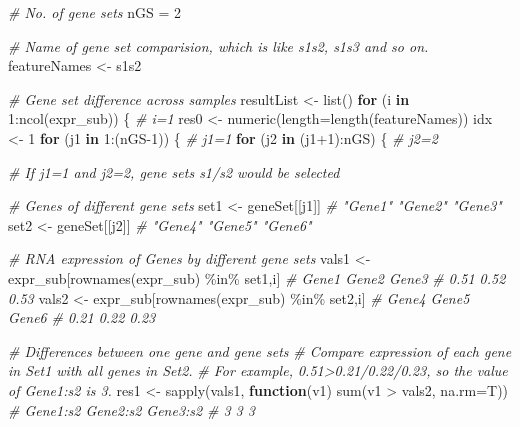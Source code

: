 \documentclass[
  12pt,
]{book}
\newenvironment{Shaded}{\begin{snugshade}}{\end{snugshade}}
\newcommand{\AttributeTok}[1]{\textcolor[rgb]{0.77,0.63,0.00}{#1}}
\newcommand{\CommentTok}[1]{\textcolor[rgb]{0.56,0.35,0.01}{\textit{#1}}}
\newcommand{\ControlFlowTok}[1]{\textcolor[rgb]{0.13,0.29,0.53}{\textbf{#1}}}
\newcommand{\DecValTok}[1]{\textcolor[rgb]{0.00,0.00,0.81}{#1}}
\newcommand{\FunctionTok}[1]{\textcolor[rgb]{0.00,0.00,0.00}{#1}}
\newcommand{\NormalTok}[1]{#1}
\newcommand{\OtherTok}[1]{\textcolor[rgb]{0.56,0.35,0.01}{#1}}
\newcommand{\SpecialCharTok}[1]{\textcolor[rgb]{0.00,0.00,0.00}{#1}}
\newcommand{\StringTok}[1]{\textcolor[rgb]{0.31,0.60,0.02}{#1}}
\begin{document}
\begin{Shaded}
\begin{Highlighting}[]
\CommentTok{\# No. of gene sets}
\NormalTok{nGS }\OtherTok{=} \DecValTok{2}

\CommentTok{\# Name of gene set comparision, which is like s1s2, s1s3 and so on.}
\NormalTok{featureNames }\OtherTok{\textless{}{-}} \StringTok{\textquotesingle{}s1s2\textquotesingle{}}

\CommentTok{\# Gene set difference across samples}
\NormalTok{resultList }\OtherTok{\textless{}{-}} \FunctionTok{list}\NormalTok{()}
\ControlFlowTok{for}\NormalTok{ (i }\ControlFlowTok{in} \DecValTok{1}\SpecialCharTok{:}\FunctionTok{ncol}\NormalTok{(expr\_sub)) \{ }\CommentTok{\# i=1}
\NormalTok{  res0 }\OtherTok{\textless{}{-}} \FunctionTok{numeric}\NormalTok{(}\AttributeTok{length=}\FunctionTok{length}\NormalTok{(featureNames))}
\NormalTok{  idx }\OtherTok{\textless{}{-}} \DecValTok{1}
  \ControlFlowTok{for}\NormalTok{ (j1 }\ControlFlowTok{in} \DecValTok{1}\SpecialCharTok{:}\NormalTok{(nGS}\DecValTok{{-}1}\NormalTok{)) \{ }\CommentTok{\# j1=1}
    \ControlFlowTok{for}\NormalTok{ (j2 }\ControlFlowTok{in}\NormalTok{ (j1}\SpecialCharTok{+}\DecValTok{1}\NormalTok{)}\SpecialCharTok{:}\NormalTok{nGS) \{ }\CommentTok{\# j2=2}
      
      \CommentTok{\# If j1=1 and j2=2, gene sets s1/s2 would be selected}
      
      \CommentTok{\# Genes of different gene sets}
\NormalTok{      set1 }\OtherTok{\textless{}{-}}\NormalTok{ geneSet[[j1]] }\CommentTok{\# "Gene1" "Gene2" "Gene3"}
\NormalTok{      set2 }\OtherTok{\textless{}{-}}\NormalTok{ geneSet[[j2]] }\CommentTok{\# "Gene4" "Gene5" "Gene6"}
      
      \CommentTok{\# RNA expression of Genes by different gene sets}
\NormalTok{      vals1 }\OtherTok{\textless{}{-}}\NormalTok{ expr\_sub[}\FunctionTok{rownames}\NormalTok{(expr\_sub) }\SpecialCharTok{\%in\%}\NormalTok{ set1,i]}
      \CommentTok{\# Gene1 Gene2 Gene3}
      \CommentTok{\# 0.51  0.52  0.53}
\NormalTok{      vals2 }\OtherTok{\textless{}{-}}\NormalTok{ expr\_sub[}\FunctionTok{rownames}\NormalTok{(expr\_sub) }\SpecialCharTok{\%in\%}\NormalTok{ set2,i]}
      \CommentTok{\# Gene4 Gene5 Gene6}
      \CommentTok{\# 0.21  0.22  0.23}

      \CommentTok{\# Differences between one gene and gene sets}
      \CommentTok{\# Compare expression of each gene in Set1 with all genes in Set2. }
      \CommentTok{\# For example, 0.51\textgreater{}0.21/0.22/0.23, so the value of Gene1:s2 is 3.}
\NormalTok{      res1 }\OtherTok{\textless{}{-}} \FunctionTok{sapply}\NormalTok{(vals1, }\ControlFlowTok{function}\NormalTok{(v1) }\FunctionTok{sum}\NormalTok{(v1 }\SpecialCharTok{\textgreater{}}\NormalTok{ vals2, }\AttributeTok{na.rm=}\NormalTok{T))}
      \CommentTok{\# Gene1:s2   Gene2:s2   Gene3:s2}
      \CommentTok{\# 3          3           3}
      

\end{Highlighting}
\end{Shaded}
\end{document}
